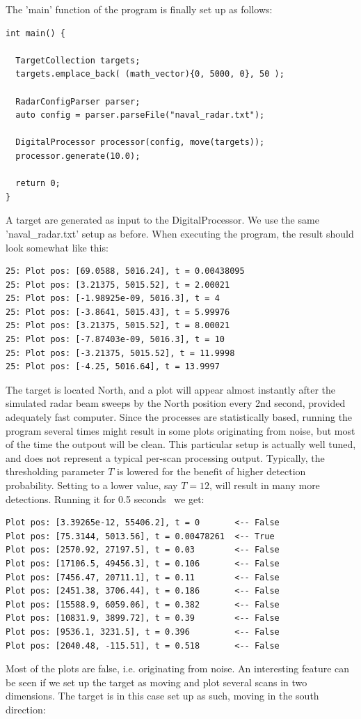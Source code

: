 \documentclass[letterpaper]{book}
\begin{document}
The 'main' function of the program is finally set up as follows:
\begin{lstlisting}
int main() {

  TargetCollection targets;
  targets.emplace_back( (math_vector){0, 5000, 0}, 50 ); 

  RadarConfigParser parser;
  auto config = parser.parseFile("naval_radar.txt");

  DigitalProcessor processor(config, move(targets));
  processor.generate(10.0);

  return 0;
}
\end{lstlisting}
A target are generated as input to the DigitalProcessor. We use the same 'naval\_radar.txt' setup as before. When executing the program, the result should look somewhat like this:
\begin{lstlisting}
25: Plot pos: [69.0588, 5016.24], t = 0.00438095
25: Plot pos: [3.21375, 5015.52], t = 2.00021
25: Plot pos: [-1.98925e-09, 5016.3], t = 4
25: Plot pos: [-3.8641, 5015.43], t = 5.99976
25: Plot pos: [3.21375, 5015.52], t = 8.00021
25: Plot pos: [-7.87403e-09, 5016.3], t = 10
25: Plot pos: [-3.21375, 5015.52], t = 11.9998
25: Plot pos: [-4.25, 5016.64], t = 13.9997
\end{lstlisting}
The target is located North, and a plot will appear almost instantly after the simulated radar beam sweeps by the North position every 2nd second, provided adequately fast computer. Since the processes are statistically based, running the program several times might result in some plots originating from noise, but most of the time the outpout will be clean. This particular setup is actually well tuned, and does not represent a typical per-scan processing output. Typically, the thresholding parameter \(T\) is lowered for the benefit of higher detection probability. Setting to a lower value, say \(T = 12\), will result in many more detections. Running it for 0.5 seconds \, we get: 
\begin{lstlisting}
Plot pos: [3.39265e-12, 55406.2], t = 0       <-- False
Plot pos: [75.3144, 5013.56], t = 0.00478261  <-- True
Plot pos: [2570.92, 27197.5], t = 0.03        <-- False
Plot pos: [17106.5, 49456.3], t = 0.106       <-- False
Plot pos: [7456.47, 20711.1], t = 0.11        <-- False
Plot pos: [2451.38, 3706.44], t = 0.186       <-- False
Plot pos: [15588.9, 6059.06], t = 0.382       <-- False
Plot pos: [10831.9, 3899.72], t = 0.39        <-- False
Plot pos: [9536.1, 3231.5], t = 0.396         <-- False 
Plot pos: [2040.48, -115.51], t = 0.518       <-- False
\end{lstlisting}
Most of the plots are false, i.e. originating from noise. An interesting feature can be seen if we set up the target as moving and plot several scans in two dimensions. The target is in this case set up as such, moving in the south direction:
\end{document}
